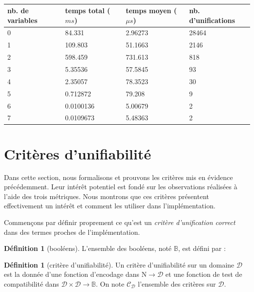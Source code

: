 \documentclass[a4paper]{report}
\theoremstyle{definition}
\newtheorem{definition}[theoreme]{Définition}
\newcommand{\N}{\mathrm{N}}
\begin{document}
\begin{table}[h]
  \centering
  \begin{tabular}{|l|l|l|l|}
    \hline
      nb. de variables &
      temps total ($ms$) &
      temps moyen ($\mu s$) &
      nb. d'unifications
    \\
    \hline
      0 & 84.331 & 2.96273 & 28464
    \\
      1 & 109.803 & 51.1663 & 2146
    \\
      2 & 598.459 & 731.613 & 818
    \\
      3 & 5.35536 & 57.5845 & 93
    \\
      4 & 2.35057 & 78.3523 & 30
    \\
      5 & 0.712872 & 79.208 & 9
    \\
      6 & 0.0100136 & 5.00679 & 2
    \\
      7 & 0.0109673 & 5.48363 & 2
    \\
    \hline
  \end{tabular}
  \caption{\label{tab_meas3}}
\end{table}


\section{Critères d'unifiabilité}

Dans cette section, nous formalisons et prouvons les critères mis en évidence précédemment. Leur intérêt potentiel est fondé sur les observations réalisées à l'aide des trois métriques. Nous montrons que ces critères présentent effectivement un intérêt et comment les utiliser dans l'implémentation.

Commençons par définir proprement ce qu'est un \emph{critère d'unification correct} dans des termes proches de l'implémentation.

\begin{definition}[booléens]
  L'ensemble des booléens, noté $\mathbb{B}$, est défini par :
\end{definition}

\begin{definition}[critère d'unifiabilité]
  Un critère d'unifiabilité sur un domaine $\mathscr{D}$ est la donnée d'une fonction d'encodage dans $\N \rightarrow \mathscr{D}$ et une fonction de test de compatibilité dans $\mathscr{D} \times \mathscr{D} \rightarrow \mathbb{B}$. On note $\mathscr{C}_\mathscr{D}$ l'ensemble des critères sur $\mathscr{D}$.
\end{definition}
\end{document}
